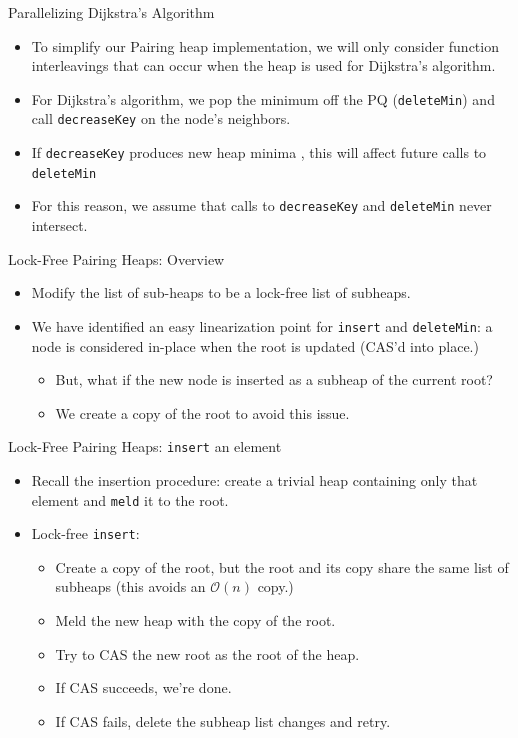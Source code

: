 \documentclass{beamer}
\begin{document}
\begin{frame}{Parallelizing Dijkstra's Algorithm}
  \begin{itemize}
  \item To simplify our Pairing heap implementation, we will only
    consider function interleavings that can occur when the heap is used
    for Dijkstra's algorithm.
  \item For Dijkstra's algorithm, we pop the minimum off the PQ (\texttt{deleteMin})
    and call \texttt{decreaseKey} on the node's neighbors.
  \item If \texttt{decreaseKey} produces new heap minima , this will affect
    future calls to \texttt{deleteMin}
  \item For this reason, we assume that calls to \texttt{decreaseKey} and \texttt{deleteMin}
    never intersect.
  \end{itemize}
\end{frame}

\begin{frame}{Lock-Free Pairing Heaps: Overview}
  \begin{itemize}
    \item Modify the list of sub-heaps to be a lock-free list of subheaps.
    \item We have identified an easy linearization point for \texttt{insert} and \texttt{deleteMin}:
      a node is considered in-place when the root is updated (CAS'd into place.)
      \begin{itemize}
        \item But, what if the new node is inserted as a subheap of the current root?
        \item We create a copy of the root to avoid this issue.
      \end{itemize}
    \end{itemize}
\end{frame}

\begin{frame}{Lock-Free Pairing Heaps: \texttt{insert} an element}
  \begin{itemize}
    \item Recall the insertion procedure: create a trivial heap containing only that
      element and \texttt{meld} it to the root.
    \item Lock-free \texttt{insert}:
      \begin{itemize}
        \item Create a copy of the root, but the root and its copy share the same
          list of subheaps (this avoids an $\mathcal{O}(n)$ copy.)
        \item Meld the new heap with the copy of the root.
        \item Try to CAS the new root as the root of the heap.
        \item If CAS succeeds, we're done.
        \item If CAS fails, delete the subheap list changes and retry.
      \end{itemize}
    \end{itemize}
\end{frame}
\end{document}
